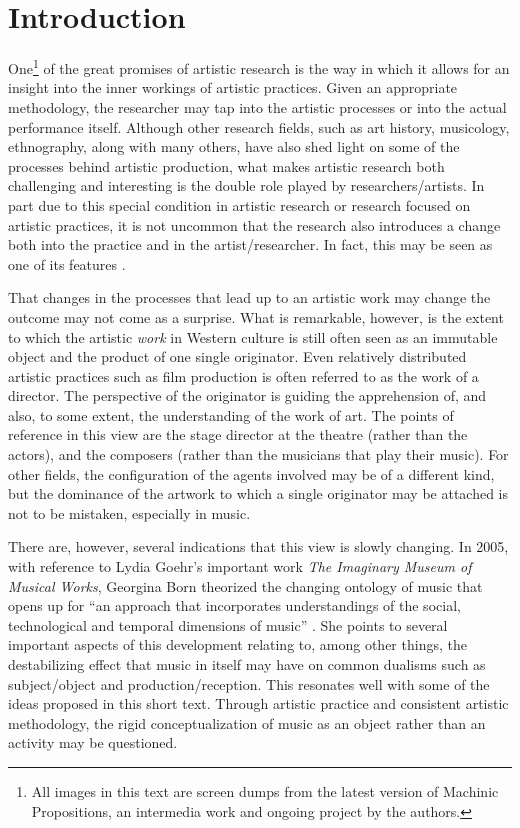 \documentclass[11pt]{article}
\begin{document}
\section*{Introduction}
\label{sec:introduction}

One\footnote{All images in this text are screen dumps from
  the latest version of Machinic Propositions, an intermedia work and
  ongoing project by
  the authors.} of the great promises of artistic research is the way in which it
allows for an insight into the inner workings of artistic
practices. Given an appropriate methodology, the researcher may tap
into the artistic processes or into the actual
performance itself. Although other research fields, such as art history,
musicology, ethnography, along with many others, have also shed light
on some of the processes behind artistic production, what makes
artistic research both challenging and interesting is the double role
played by researchers/artists. In part due to this special condition in artistic research or research focused
on artistic practices, it is not uncommon that the research also
introduces a change both into the practice and in the
artist/researcher. In fact, this may be seen as one of its features
\citep[][p. 27]{frisk-ost13}.

That changes in the processes that lead up to an artistic work may
change the outcome may not come as a surprise. What is remarkable,
however, is the extent to which the artistic
\emph{work} in Western culture is still often seen as an immutable
object and the product of one single originator. Even
relatively distributed artistic practices such as film production is
often referred to as the work of a director. The perspective of the
originator is guiding the apprehension of, and also, to some extent,
the understanding of the work of art. The points of reference in this
view are the stage 
director at the theatre (rather than the actors), and the composers
(rather than the musicians that play their music). For other fields, the configuration of the
agents involved may be of a different kind, but the dominance of the 
artwork to which a single originator may be attached is not to
be mistaken, especially in music.

There are, however, several indications that this view is slowly
changing. In 2005, with reference to Lydia Goehr's important work
\emph{The Imaginary Museum of Musical Works}, Georgina Born theorized
the changing ontology of music that opens up for ``an approach that
incorporates understandings of the social, technological and temporal
dimensions of music'' \citep[p. 8]{Born2005}. She points to several
important aspects of this development relating to, among other things,
the destabilizing effect that music in itself may have on common
dualisms such as subject/object and production/reception. This
resonates well with some of the ideas proposed in this short
text. Through artistic practice and consistent artistic methodology, the rigid conceptualization of music as an object rather than an activity may be questioned.
\end{document}
